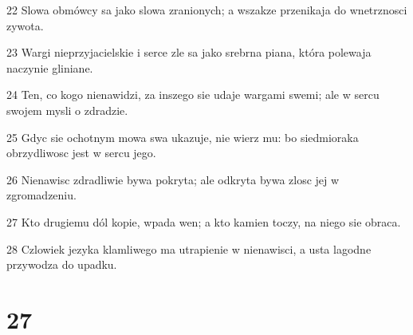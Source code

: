 \par 22 Slowa obmówcy sa jako slowa zranionych; a wszakze przenikaja do wnetrznosci zywota.
\par 23 Wargi nieprzyjacielskie i serce zle sa jako srebrna piana, która polewaja naczynie gliniane.
\par 24 Ten, co kogo nienawidzi, za inszego sie udaje wargami swemi; ale w sercu swojem mysli o zdradzie.
\par 25 Gdyc sie ochotnym mowa swa ukazuje, nie wierz mu: bo siedmioraka obrzydliwosc jest w sercu jego.
\par 26 Nienawisc zdradliwie bywa pokryta; ale odkryta bywa zlosc jej w zgromadzeniu.
\par 27 Kto drugiemu dól kopie, wpada wen; a kto kamien toczy, na niego sie obraca.
\par 28 Czlowiek jezyka klamliwego ma utrapienie w nienawisci, a usta lagodne przywodza do upadku.

\chapter{27}

